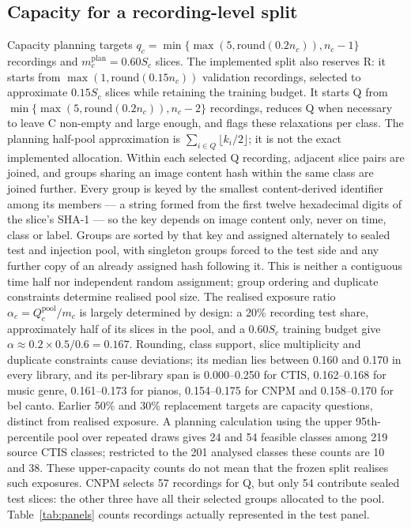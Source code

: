 \subsection{Capacity for a recording-level split}\label{sec:capacity}

Capacity planning targets $q_c=\min\{\max(5,\mathrm{round}(0.2n_c)),n_c-1\}$
recordings and $m_c^{\text{plan}}=0.60S_c$ slices. The implemented split also reserves R:
it starts from $\max(1,\mathrm{round}(0.15n_c))$ validation recordings, selected to
approximate $0.15S_c$ slices while retaining the training budget. It starts Q from
$\min\{\max(5,\mathrm{round}(0.2n_c)),n_c-2\}$ recordings, reduces Q when necessary to
leave C non-empty and large enough, and flags these relaxations per class.
The planning half-pool approximation is $\sum_{i\in Q}\lfloor k_i/2\rfloor$;
it is not the exact implemented allocation. Within each selected Q recording, adjacent slice
pairs are joined, and groups sharing an image content hash within the same class are joined
further. Every group is keyed by the smallest content-derived identifier among its members --- a
string formed from the first twelve hexadecimal digits of the slice's SHA-1 --- so the key
depends on image content only, never on time, class or label. Groups are sorted by that key and
assigned alternately to sealed test and injection pool, with singleton groups forced to the test
side and any further copy of an already assigned hash following it. This is neither a contiguous
time half nor independent random assignment; group ordering and duplicate constraints determine
realised pool size.
The realised
exposure ratio $\alpha_c = Q^{\text{pool}}_c/m_c$ is largely determined by design:
a 20\% recording test share, approximately half of its slices in the pool, and a
$0.60S_c$ training budget give $\alpha\approx0.2\times0.5/0.6=0.167$.
Rounding, class support, slice multiplicity and duplicate constraints cause deviations; its median lies between 0.160 and 0.170 in every library, and its per-library span
is 0.000--0.250 for CTIS, 0.162--0.168 for music genre, 0.161--0.173 for pianos, 0.154--0.175
for CNPM and 0.158--0.170 for bel canto. Earlier 50\% and 30\% replacement targets are
capacity questions, distinct from realised exposure. A planning calculation using the upper
95th-percentile pool over repeated draws gives 24 and 54 feasible classes among 219 source
CTIS classes; restricted to the 201 analysed classes these counts are 10 and 38.
These upper-capacity counts do not mean that the frozen split realises such exposures.
CNPM selects 57 recordings for Q, but only 54 contribute sealed test slices: the other three
have all their selected groups allocated to the pool. Table~\ref{tab:panels} counts
recordings actually represented in the test panel.

